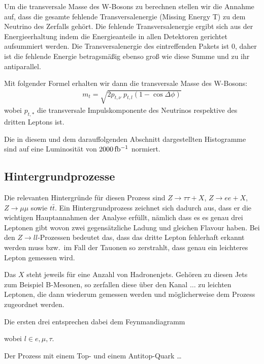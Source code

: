 Um die transversale Masse des W-Bosons zu berechnen stellen wir die Annahme auf,
dass die gesamte fehlende Transversalenergie (Missing Energy T) zu dem Neutrino
des Zerfalls gehört. Die fehlende Transversalenergie ergibt sich aus der
Energieerhaltung indem die Energieanteile in allen Detektoren gerichtet
aufsummiert werden. Die Transversalenergie des eintreffenden Pakets ist $0$,
daher ist die fehlende Energie betragsmäßig ebenso groß wie diese Summe und zu
ihr antiparallel.

Mit folgender Formel erhalten wir dann die transversale Masse des W-Bosons: 
\begin{align}
  m_t = \sqrt{2 p_{t,\nu}\; p_{t,l} (1 - \cos{\Delta\phi})}
  \label{eqn:trans}
\end{align}
wobei $p_{t,*}$ die transversale Impulskomponente des Neutrinos respektive des
dritten Leptons ist.

Die in diesem und dem darauffolgenden Abschnitt dargestellten Histogramme sind
auf eine Luminosität von $\unit[2000]{fb^{-1}}$ normiert.

\subsection{Hintergrundprozesse}
Die relevanten Hintergründe für diesen Prozess sind $Z\to\tau\tau + X$, $Z\to e
e + X$, $Z\to\mu\mu$ sowie $t\bar{t}$. Ein Hintergrundprozess zeichnet sich
dadurch aus, dass er die wichtigen Hauptannahmen der Analyse erfüllt, nämlich
dass es es genau drei Leptonen gibt wovon zwei gegensätzliche Ladung und
gleichen Flavour haben. Bei den $Z\to l l$-Prozessen bedeutet das, dass das
dritte Lepton fehlerhaft erkannt werden muss bzw.\ im Fall der Tauonen so
zerstrahlt, dass genau ein leichteres Lepton gemessen wird.

Das $X$ steht jeweils für eine Anzahl von Hadronenjets. Gehören zu diesen Jets
zum Beispiel B-Mesonen, so zerfallen diese über den Kanal $\dots$ zu leichten
Leptonen, die dann wiederum gemessen werden und möglicherweise dem Prozess
zugeordnet werden.


Die ersten drei entsprechen dabei dem
Feynmandiagramm
\begin{figure}[h!]
  \begin{center}
%    
  \end{center}
\end{figure}
wobei $l \in {e,\mu,\tau}$. 

Der Prozess mit einem Top- und einem Antitop-Quark \dots

